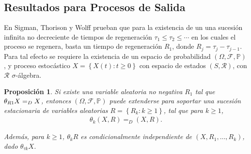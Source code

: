 \documentclass{article}
\newtheorem{Prop}{Proposición}[section]
\newcommand{\prob}{\mathbb{P}}
\numberwithin{equation}{section}
\begin{document}
\subsection{Resultados para Procesos de Salida}

En Sigman, Thorison y Wolff \cite{Sigman2} prueban que para la existencia de un una sucesi\'on infinita no decreciente de tiempos de regeneraci\'on $\tau_{1}\leq\tau_{2}\leq\cdots$ en los cuales el proceso se regenera, basta un tiempo de regeneraci\'on $R_{1}$, donde $R_{j}=\tau_{j}-\tau_{j-1}$. Para tal efecto se requiere la existencia de un espacio de probabilidad $\left(\Omega,\mathcal{F},\prob\right)$, y proceso estoc\'astico $\textit{X}=\left\{X\left(t\right):t\geq0\right\}$ con espacio de estados $\left(S,\mathcal{R}\right)$, con $\mathcal{R}$ $\sigma$-\'algebra.

\begin{Prop}
Si existe una variable aleatoria no negativa $R_{1}$ tal que $\theta_{R\footnotesize{1}}X=_{D}X$, entonces $\left(\Omega,\mathcal{F},\prob\right)$ puede extenderse para soportar una sucesi\'on estacionaria de variables aleatorias $R=\left\{R_{k}:k\geq1\right\}$, tal que para $k\geq1$,
\begin{eqnarray*}
\theta_{k}\left(X,R\right)=_{D}\left(X,R\right).
\end{eqnarray*}

Adem\'as, para $k\geq1$, $\theta_{k}R$ es condicionalmente independiente de $\left(X,R_{1},\ldots,R_{k}\right)$, dado $\theta_{\tau k}X$.

\end{Prop}
\end{document}
